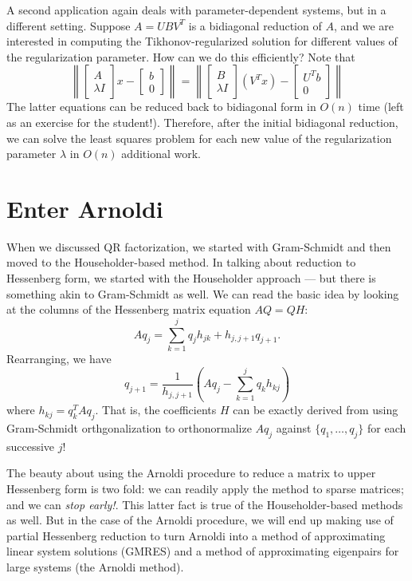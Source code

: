 \documentclass[12pt, leqno]{article}
\begin{document}
A second application again deals with parameter-dependent
systems, but in a different setting.  Suppose $A = UBV^T$ is a
bidiagonal reduction of $A$, and we are interested in computing
the Tikhonov-regularized solution for different values of the
regularization parameter.  How can we do this efficiently?
Note that
\[
\left\|
\begin{bmatrix} A \\ \lambda I \end{bmatrix} x -
\begin{bmatrix} b \\ 0 \end{bmatrix}
\right\| =
\left\|
\begin{bmatrix}
  B \\
  \lambda I
\end{bmatrix}
(V^T x) -
\begin{bmatrix}
  U^T b \\
  0
\end{bmatrix}
\right\|
\]
The latter equations can be reduced back to bidiagonal form in $O(n)$
time (left as an exercise for the student!).  Therefore, after the
initial bidiagonal reduction, we can solve the least squares
problem for each new value of the regularization parameter $\lambda$
in $O(n)$ additional work.

\section{Enter Arnoldi}

When we discussed QR factorization, we started with Gram-Schmidt and
then moved to the Householder-based method.  In talking about
reduction to Hessenberg form, we started with the Householder approach
--- but there is something akin to Gram-Schmidt as well.  We can read
the basic idea by looking at the columns of the Hessenberg matrix
equation $A Q = Q H$:
\[
  A q_{j} = \sum_{k=1}^j q_j h_{jk} + h_{j,j+1} q_{j+1}.
\]
Rearranging, we have
\[
  q_{j+1} = \frac{1}{h_{j,j+1}} \left( A q_{j} - \sum_{k=1}^j q_k
  h_{kj} \right)
\]
where $h_{kj} = q_k^T A q_j$.  That is, the coefficients $H$ can be
exactly derived from using Gram-Schmidt orthgonalization to
orthonormalize $A q_j$ against $\{q_1, \ldots, q_j\}$ for each
successive $j$!

The beauty about using the Arnoldi procedure to reduce a matrix to
upper Hessenberg form is two fold: we can readily apply
the method to sparse matrices; and we can {\em stop early!}.
This latter fact is true of the Householder-based methods as well.
But in the case of the Arnoldi procedure, we will end up making
use of partial Hessenberg reduction to turn Arnoldi into a method of
approximating linear system solutions (GMRES) and a method of
approximating eigenpairs for large systems (the Arnoldi method).
\end{document}
